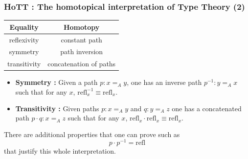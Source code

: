 \documentclass{beamer}
\begin{document}
    \begin{frame}
        \frametitle{HoTT : The homotopical interpretation of Type Theory (2)}
        \begin{center}
            \begin{tabular}{|c|c|}
              \hline Equality & Homotopy \\
              \hline reflexivity & constant path \\
              \hline symmetry  & path inversion \\
              \hline transitivity & concatenation of paths \\
              \hline
            \end{tabular}
        \end{center}
        \pause
        \begin{itemize}
            \item \textbf{Symmetry : } Given a path $p : x =_A y$, one has an inverse path $p^{-1} : y =_A x$ such that for any $x$, $\mathrm{refl}_x^{-1} \equiv \mathrm{refl}_x$.
            \item \textbf{Transitivity : } Given paths $p : x =_A y$ and $q : y =_A z$ one has a concatenated path $p \cdot q : x =_A z$ such that for any $x$, $\mathrm{refl}_x \cdot \mathrm{refl}_x \equiv \mathrm{refl}_x$.
        \end{itemize}
        \pause
        There are additional properties that one can prove such as $$p \cdot p^{-1} = \mathrm{refl}$$ that justify this whole interpretation.
    \end{frame}
\end{document}
